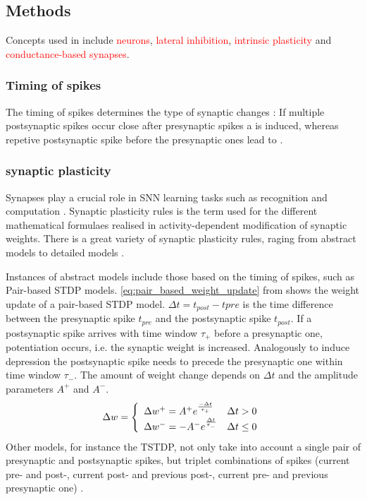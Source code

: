 \subsection{Methods}
\label{subsec:methods}

Concepts used in \cite{SNN} include \textcolor{red}{ neurons}, \textcolor{red}{lateral inhibition}, \textcolor{red}{intrinsic plasticity} and \textcolor{red}{conductance-based synapses}.

\subsubsection{Timing of spikes}
The timing of spikes determines the type of synaptic changes \cite{LTP_D_bio}:
If multiple postsynaptic spikes occur close after presynaptic spikes a  is induced, 
whereas repetive postsynaptic spike before the presynaptic ones lead to .


\subsubsection{synaptic plasticity}
Synapses play a crucial role in \ac{SNN} learning tasks such as recognition and computation \cite{Synaptic_plasticity}.
Synaptic plasticity rules is the term used for the different mathematical formulaes realised in activity-dependent modification of synaptic weights.
There is a great variety of synaptic plasticity rules, raging from abstract models to detailed models \cite{Synaptic_plasticity}.

Instances of abstract models include those based on the timing of spikes, such as Pair-based \ac{STDP} models.
\autoref{eq:pair_based_weight_update} from \cite{Synaptic_plasticity} shows the weight update of a pair-based \ac{STDP} model.
$\Delta t = t_{post} - t{pre}$ is the time difference between the presynaptic spike $t_{pre}$ and the postsynaptic spike $t_{post}$.
If a postsynaptic spike arrives with time window $\tau_+$ before a presynaptic one, potentiation occurs, i.e. the synaptic weight is increased. 
Analogously to induce depression the postsynaptic spike needs to precede the presynaptic one within time window $\tau_-$.
The amount of weight change depends on $\Delta t $ and the amplitude parameters $A^+$ and $A^-$.
%
\begin{equation}
    \centering
    \label{eq:pair_based_weight_update}
    \Delta w = \left\{
        \begin{array}{ll}
        \Delta w^+ = A^+ e^{\frac{-\Delta t}{\tau_+}} & \Delta t > 0 \\
        \Delta w^- = -A^- e^{\frac{\Delta t}{\tau_-}} & \Delta t \le 0 \\
        \end{array}
        \right.
\end{equation}
%
Other models, for instance the \ac{TSTDP}, not only take into account a single pair of presynaptic and postsynaptic spikes, 
but triplet combinations of spikes 
(current pre- and post-, current post- and previous post-, current pre- and previous presynaptic one) \cite{Synaptic_plasticity}.

